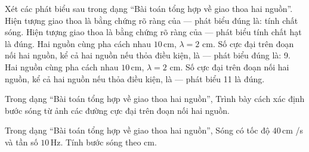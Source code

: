 \begin{ex}
Xét các phát biểu sau trong dạng “Bài toán tổng hợp về giao thoa hai nguồn”.
\choiceTF
{\True Hiện tượng giao thoa là bằng chứng rõ ràng của — phát biểu đúng là: tính chất sóng.}
{Hiện tượng giao thoa là bằng chứng rõ ràng của — phát biểu tính chất hạt là đúng.}
{\True Hai nguồn cùng pha cách nhau $10\,\text{cm}$, $\lambda=2$ cm. Số cực đại trên đoạn nối hai nguồn, kể cả hai nguồn nếu thỏa điều kiện, là — phát biểu đúng là: 9.}
{Hai nguồn cùng pha cách nhau $10\,\text{cm}$, $\lambda=2$ cm. Số cực đại trên đoạn nối hai nguồn, kể cả hai nguồn nếu thỏa điều kiện, là — phát biểu 11 là đúng.}
\end{ex}

\begin{ex}
Trong dạng “Bài toán tổng hợp về giao thoa hai nguồn”, Trình bày cách xác định bước sóng từ ảnh các đường cực đại trên đoạn nối hai nguồn.
\choiceTF

\end{ex}

\begin{ex}
Trong dạng “Bài toán tổng hợp về giao thoa hai nguồn”, Sóng có tốc độ $40\,\text{cm}$ /s và tần số $10\,\text{Hz}$. Tính bước sóng theo cm.
\end{ex}


